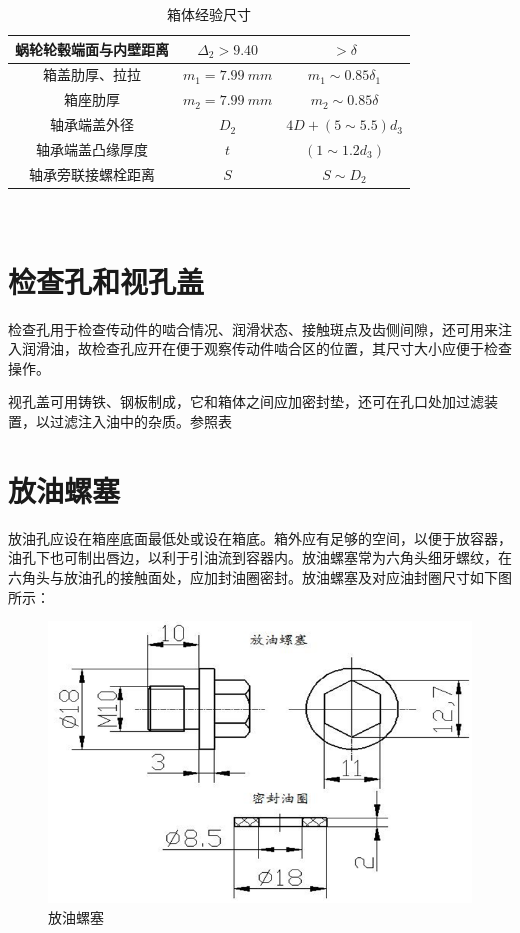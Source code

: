 \documentclass[UTF8,11pt,a4paper,oneside,final,zihao=-4,]{ctexrep}%
\newcommand{\dunhao}{、}
\begin{document}
\begin{table}[h]
\begin{tabular}{c|c|c}
			蜗轮轮毂端面与内壁距离 & $\Delta_2>9.40$     & $>\delta$                   \\ \hline
			箱盖肋厚\dunhao 拉拉   & $m_1=7.99\ mm$      & $m_1\sim 0.85\delta_1$      \\ \hline
			箱座肋厚               & $m_2=7.99\ mm$      & $m_2\sim 0.85\delta$        \\ \hline
			轴承端盖外径           & $D_2$               & $4D+(5\sim 5.5)d_3$         \\ \hline
			轴承端盖凸缘厚度       & $t$                 & $(1\sim 1.2d_3)$            \\ \hline
			轴承旁联接螺栓距离     & $S$                 & $S\sim D_2$                 \\ \hline
		\end{tabular}
		\caption{箱体经验尺寸}
	\end{table}\ \
	\section{检查孔和视孔盖}
	{检查孔用于检查传动件的啮合情况、润滑状态、接触斑点及齿侧间隙，还可用来注入润滑油，故检查孔应开在便于观察传动件啮合区的位置，其尺寸大小应便于检查操作。}\par
	{	视孔盖可用铸铁、钢板制成，它和箱体之间应加密封垫，还可在孔口处加过滤装置，以过滤注入油中的杂质。参照表}
	
	\section{放油螺塞}
	{放油孔应设在箱座底面最低处或设在箱底。箱外应有足够的空间，以便于放容器，油孔下也可制出唇边，以利于引油流到容器内。放油螺塞常为六角头细牙螺纹，在六角头与放油孔的接触面处，应加封油圈密封。放油螺塞及对应油封圈尺寸如下图所示：}
	\begin{figure}[h!]
		\centering
		\includegraphics[width=0.7\linewidth]{photos/螺塞}
		\caption{放油螺塞}
		\label{fig:}
	\end{figure}
	
\end{document}
